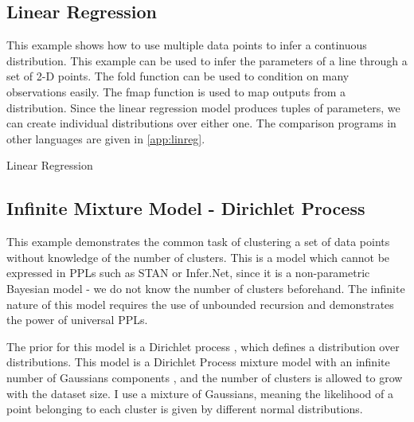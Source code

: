 \documentclass[sigconf]{acmart}
\begin{document}
\subsection{Linear Regression}
This example shows how to use multiple data points to infer a continuous distribution. This example can be used to infer the parameters of a line through a set of 2-D points. The fold function can be used to condition on many observations easily. The fmap function is used to map outputs from a distribution. Since the linear regression model produces tuples of parameters, we can create individual distributions over either one. The comparison programs in other languages are given in \ref{app:linreg}.

\begin{listing}[!ht]
  \caption{Linear Regression}
  \label{lst:linreg}
\end{listing}

\subsection{Infinite Mixture Model - Dirichlet Process}
This example demonstrates the common task of clustering a set of data points without knowledge of the number of clusters. This is a model which cannot be expressed in PPLs such as STAN or Infer.Net, since it is a non-parametric Bayesian model - we do not know the number of clusters beforehand. The infinite nature of this model requires the use of unbounded recursion and demonstrates the power of universal PPLs.

The prior for this model is a Dirichlet process \cite{teh2010dirichlet}, which defines a distribution over distributions. This model is a Dirichlet Process mixture model with an infinite number of Gaussians components \cite{dpmm}, and the number of clusters is allowed to grow with the dataset size. I use a mixture of Gaussians, meaning the likelihood of a point belonging to each cluster is given by different normal distributions.

\begin{listing}[H]
\end{listing}


\end{document}
